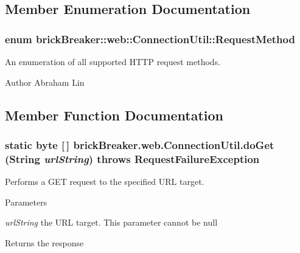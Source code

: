 \subsection{Member Enumeration Documentation}
\hypertarget{classbrick_breaker_1_1web_1_1_connection_util_a2f1cc93d9583cfc78cb27b62c7f1359a}{
\subsubsection[{RequestMethod}]{\setlength{\rightskip}{0pt plus 5cm}enum {\bf brickBreaker::web::ConnectionUtil::RequestMethod}}}
\label{classbrick_breaker_1_1web_1_1_connection_util_a2f1cc93d9583cfc78cb27b62c7f1359a}
An enumeration of all supported HTTP request methods.

\begin{DoxyAuthor}{Author}
Abraham Lin 
\end{DoxyAuthor}


\subsection{Member Function Documentation}
\hypertarget{classbrick_breaker_1_1web_1_1_connection_util_a30e5317eb7d69805c2ea0be2e958d1f5}{
\subsubsection[{doGet}]{\setlength{\rightskip}{0pt plus 5cm}static byte \mbox{[}$\,$\mbox{]} brickBreaker.web.ConnectionUtil.doGet (String {\em urlString})  throws {\bf RequestFailureException} }}
\label{classbrick_breaker_1_1web_1_1_connection_util_a30e5317eb7d69805c2ea0be2e958d1f5}
Performs a GET request to the specified URL target.


\begin{DoxyParams}{Parameters}
\item[{\em urlString}]the URL target. This parameter cannot be {\ttfamily null} \end{DoxyParams}
\begin{DoxyReturn}{Returns}
the response
\end{DoxyReturn}

